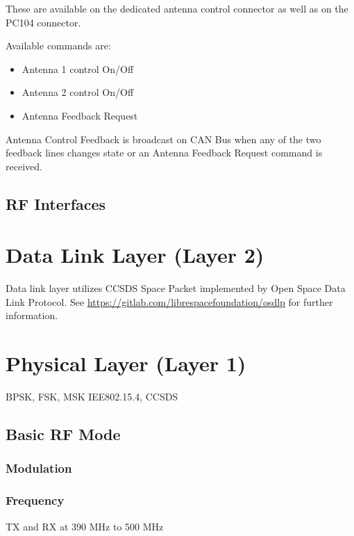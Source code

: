 \documentclass[english,title,a4paper]{report}
\begin{document}
These are available on the dedicated antenna control connector as well as on the PC104 connector.

Available commands are:

\begin{itemize}
  \item Antenna 1 control On/Off
  \item Antenna 2 control On/Off
  \item Antenna Feedback Request
\end{itemize}

Antenna Control Feedback is broadcast on CAN Bus when any of the two feedback lines changes state or an Antenna Feedback Request command is received.

\section{RF Interfaces}\label{rf-interfaces}

\chapter{Data Link Layer (Layer 2)}\label{data-link-layer-layer-2}

Data link layer utilizes CCSDS Space Packet implemented by Open Space Data Link Protocol.
See \url{https://gitlab.com/librespacefoundation/osdlp} for further information.

\chapter{Physical Layer (Layer 1)}\label{physical-layer-layer-1}

BPSK, FSK, MSK IEE802.15.4, CCSDS

\section{Basic RF Mode}\label{basic-rf-mode}

\subsection{Modulation}\label{modulation}

\subsection{Frequency}\label{frequency}

TX and RX at 390 MHz to 500 MHz
\end{document}
